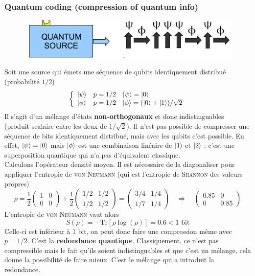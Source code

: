 \subsubsection{Quantum coding (compression of quantum info)}
	\begin{figure}
	\includegraphics[scale=0.25]{ch3/image1}
	\end{figure}
Soit une source qui émets une séquence de qubits identiquement distribué (probabilité $1/2$)
\begin{equation}
\left\{\begin{array}{lll}
\ket\psi &p=1/2&\ket\psi =\ket0\\
\ket\phi &p=1/2&\ket\phi =(\ket0+\ket1)/\sqrt{2}
\end{array}\right.
\end{equation}
Il s'agit d'un mélange d'états \textbf{non-orthogonaux} et donc indistinguables (produit scalaire entre
les deux de $1/\sqrt{2}$). Il n'est pas
possible de compresser une séquence de bits identiquement distribué, mais avec les qubits c'est
possible. En effet, $\ket\psi=\ket0$ mais $\ket\phi$ est une combinaison linéaire de 
$\ket1$ et $\ket2$ : c'est une superposition quantique qui n'a pas d'équivalent classique.\\

Calculons l'opérateur densité moyen. Il est nécessaire de la diagonaliser pour appliquer l'entropie
de \textsc{von Neumann} (qui est l'entropie de \textsc{Shannon} des valeurs propres)
\begin{equation}
\rho = \frac{1}{2}\left(\begin{array}{cc}
1&0\\
0&0
\end{array}\right)+\frac{1}{2}\left(\begin{array}{cc}
1/2&1/2\\
1/2&1/2
\end{array}\right)=\left(\begin{array}{cc}
3/4&1/4\\
1/7&1/4
\end{array}\right)\quad\Rightarrow\quad\left(\begin{array}{cc}
0.85&0\\
0&0.85
\end{array}\right)
\end{equation}
L'entropie de \textsc{von Neumann} vaut alors
\begin{equation}
S(\rho) = -\text{Tr}[\rho\log(\rho)] = 0.6 < 1\text{ bit}
\end{equation}
Celle-ci est inférieur à 1 bit, on peut donc faire une compression même avec $p=1/2$. C'est la \textbf{redondance
quantique}. Classiquement, ce n'est pas compressible mais le fait qu'ils soient indistinguables 
et que c'est un mélange, cela donne la possibilité de faire mieux. C'est le mélange qui a introduit
la redondance.


